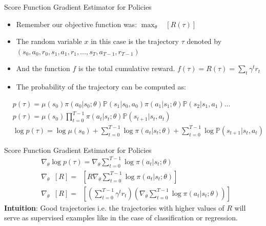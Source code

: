 \begin{frame}{Score Function Gradient Estimator for Policies}
\begin{itemize}
    \item Remember our objective function was: $\max_{\theta}$ $\mathop{\mathbb{E}_{\tau}}[R(\tau)]$
    \item The random variable $x$ in this case is the trajectory $\tau$ denoted by $(s_0,a_0,r_0,s_1,a_1,r_1,...,s_T, a_{T-1}, r_{T-1})$
    \item And the function $f$ is the total cumulative reward. $f(\tau) = R(\tau) = \sum_t \gamma^tr_t$
    \item The probability of the trajectory can be computed as:
\end{itemize}
\begin{equation*}
    \begin{split}
        &p(\tau) = \mu(s_0)\pi(a_0|s_0;\theta)\mathbb{P}(s_1|s_0,a_0)\pi(a_1|s_1;\theta)\mathbb{P}(s_2|s_1,a_1)...\\
        &p(\tau)= \mu(s_0)\prod_{t=0}^{T-1} \pi(a_t|s_t;\theta)\mathbb{P}(s_{t+1}|s_t,a_t)\\
    &\log p(\tau) = \log \mu(s_0) + \sum_{t=0}^{T-1}\log\pi(a_t|s_t;\theta) + \sum_{t=0}^{T-1}\log \mathbb{P}(s_{t+1}|s_t,a_t)
    \end{split}
\end{equation*}

    
\end{frame}
\begin{frame}{Score Function Gradient Estimator for Policies}
    \begin{equation*}
        \begin{split}
            & \nabla_\theta \log p(\tau) = \nabla_\theta \sum_{t=0}^{T-1}\log\pi(a_t|s_t;\theta) \\
            & \nabla_\theta \mathop{\mathbb{E}_\tau}[R] = \mathop{\mathbb{E}_\tau}[R \nabla_\theta \sum_{t=0}^{T-1}\log\pi(a_t|s_t;\theta)]\\
            & \nabla_\theta \mathop{\mathbb{E}_\tau}[R] = \mathop{\mathbb{E}_\tau}[(\sum_{t=0}^{T-1} \gamma^tr_t)( \nabla_\theta \sum_{t=0}^{T-1}\log\pi(a_t|s_t;\theta))]
        \end{split}
    \end{equation*}
    \textbf{Intuition}: Good trajectories i.e. the trajectories with higher values of $R$ will serve as supervised examples like in the case of classification or regression.
\end{frame}

